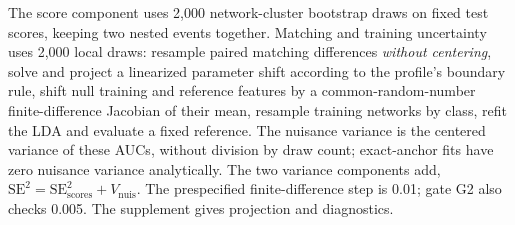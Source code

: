 The score component uses 2,000 network-cluster bootstrap draws on fixed test scores, keeping two nested events together. %
Matching and training uncertainty uses 2,000 local draws: resample paired matching differences \emph{without centering}, solve and project a linearized parameter shift according to the profile's boundary rule, shift null training and reference features by a common-random-number finite-difference Jacobian of their mean, resample training networks by class, refit the LDA and evaluate a fixed reference. %
The nuisance variance is the centered variance of these AUCs, without division by draw count; exact-anchor fits have zero nuisance variance analytically. %
The two variance components add, $\mathrm{SE}^2=\mathrm{SE}_{\mathrm{scores}}^2+V_{\mathrm{nuis}}$. %
The prespecified finite-difference step is 0.01; gate G2 also checks 0.005. %
The supplement gives projection and diagnostics. %

